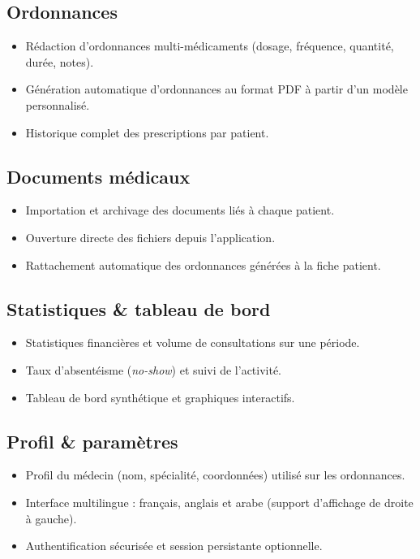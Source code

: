 \documentclass[11pt,a4paper]{article}
\begin{document}
\subsection*{Ordonnances}
\begin{itemize}
  \item Rédaction d'ordonnances multi-médicaments (dosage, fréquence,
        quantité, durée, notes).
  \item Génération automatique d'ordonnances au format PDF à partir d'un
        modèle personnalisé.
  \item Historique complet des prescriptions par patient.
\end{itemize}

\subsection*{Documents médicaux}
\begin{itemize}
  \item Importation et archivage des documents liés à chaque patient.
  \item Ouverture directe des fichiers depuis l'application.
  \item Rattachement automatique des ordonnances générées à la fiche patient.
\end{itemize}

\subsection*{Statistiques \& tableau de bord}
\begin{itemize}
  \item Statistiques financières et volume de consultations sur une période.
  \item Taux d'absentéisme (\textit{no-show}) et suivi de l'activité.
  \item Tableau de bord synthétique et graphiques interactifs.
\end{itemize}

\subsection*{Profil \& paramètres}
\begin{itemize}
  \item Profil du médecin (nom, spécialité, coordonnées) utilisé sur les
        ordonnances.
  \item Interface multilingue : français, anglais et arabe (support
        d'affichage de droite à gauche).
  \item Authentification sécurisée et session persistante optionnelle.
\end{itemize}
\end{document}
